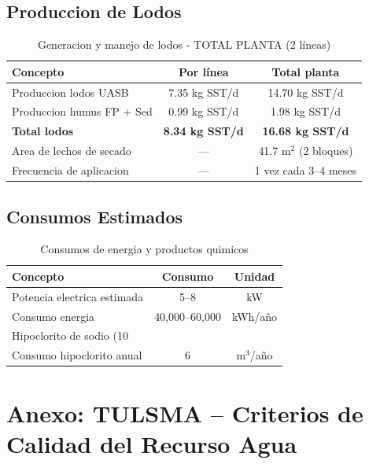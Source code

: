 \documentclass[12pt,a4paper]{article}
\begin{document}
\subsection{Produccion de Lodos}

\begin{table}[H]
\centering
\caption{Generacion y manejo de lodos - TOTAL PLANTA (2 líneas)}
\begin{tabular}{lcc}
\toprule
\textbf{Concepto} & \textbf{Por línea} & \textbf{Total planta} \\
\midrule
Produccion lodos UASB & 7.35 kg SST/d & 14.70 kg SST/d \\
Produccion humus FP + Sed & 0.99 kg SST/d & 1.98 kg SST/d \\
\midrule
\textbf{Total lodos} & \textbf{8.34 kg SST/d} & \textbf{16.68 kg SST/d} \\
Area de lechos de secado & --- & 41.7 m$^2$ (2 bloques) \\
Frecuencia de aplicacion & --- & 1 vez cada 3--4 meses \\
\bottomrule
\end{tabular}
\end{table}

\subsection{Consumos Estimados}

\begin{table}[H]
\centering
\caption{Consumos de energia y productos quimicos}
\begin{tabular}{lcc}
\toprule
\textbf{Concepto} & \textbf{Consumo} & \textbf{Unidad} \\
\midrule
Potencia electrica estimada & 5--8 & kW \\
Consumo energia & 40,000--60,000 & kWh/a\~no \\
Hipoclorito de sodio (10\\%
Consumo hipoclorito anual & 6 & m$^3$/a\~no \\
\bottomrule
\end{tabular}
\end{table}



\newpage
\appendix
\section{Anexo: TULSMA -- Criterios de Calidad del Recurso Agua}
\label{app:tulsma}
\end{document}
